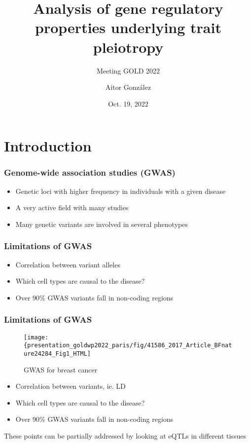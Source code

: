 \documentclass{beamer}
\title{Analysis of gene regulatory properties underlying trait pleiotropy}
\subtitle{Meeting GOLD 2022}
\author{Aitor Gonz\'alez}
\institute{Aix Marseille Univ, INSERM, TAGC}
\date{Oct. 19, 2022}
\begin{document}
\begin{frame}

\titlepage

\end{frame}

\section{Introduction} %

\begin{frame}
\frametitle{Genome-wide association studies (GWAS)}

\begin{itemize}
\item Genetic loci with higher frequency in individuals with a given disease
\item A very active field with many studies
\item Many genetic variants are involved in several phenotypes
\end{itemize}

\end{frame}

\begin{frame}
\frametitle{Limitations of GWAS}

\begin{itemize}
\item Correlation between variant alleles
\item Which cell types are causal to the disease?
\item Over 90\% GWAS variants fall in non-coding regions
\end{itemize}

\end{frame}

\begin{frame}
\frametitle{Limitations of GWAS}

\begin{figure}[!]
\texttt{[image: \{presentation\_goldwp2022\_paris/fig/41586\_2017\_Article\_BFnature24284\_Fig1\_HTML]}
\caption{GWAS for breast cancer}
\end{figure}

\begin{itemize}
\item Correlation between variants, ie. LD
\item Which cell types are causal to the disease?
\item Over 90\% GWAS variants fall in non-coding regions
\end{itemize}
%
\vfill
%
These points can be partially addressed by looking at eQTLs in different tissues

\let\thefootnote\relax{}
\end{frame}
\end{document}
